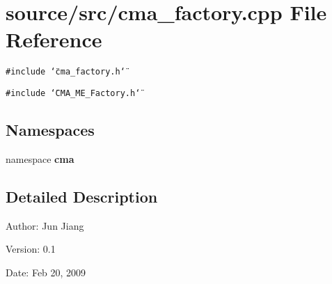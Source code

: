 \section{source/src/cma\_\-factory.cpp File Reference}
\label{cma__factory_8cpp}
{\tt \#include \char`\"{}cma\_\-factory.h\char`\"{}}\par
{\tt \#include \char`\"{}CMA\_\-ME\_\-Factory.h\char`\"{}}\par
\subsection*{Namespaces}
\begin{CompactItemize}
\item 
namespace \textbf{cma}
\end{CompactItemize}


\subsection{Detailed Description}
\begin{Desc}
\item[Author:]Jun Jiang \end{Desc}
\begin{Desc}
\item[Version:]0.1 \end{Desc}
\begin{Desc}
\item[Date:]Feb 20, 2009 \end{Desc}
